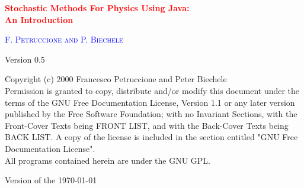 \documentclass[fleqn,10pt,a4paper,openright, draft]{book}
\begin{document}


\begin{titlepage}

\begin{center}
\huge 
\textcolor{red}{
\textbf{
Stochastic Methods For Physics Using Java: \\
An Introduction
} }
\end{center}
\vspace*{.5cm}

\begin{center}
\LARGE
\textcolor{blue}{
\textsc{F. Petruccione and P. Biechele }}
\end{center}
\vfill
\begin{center}
\textsf{\LARGE Version 0.5}
\end{center}
\vfill
\begin{center}
\large
  Copyright (c)  2000  Francesco Petruccione and Peter Biechele \\
      Permission is granted to copy, distribute and/or modify this document
      under the terms of the GNU Free Documentation License, Version 1.1
      or any later version published by the Free Software Foundation;
      with no Invariant Sections, with the
      Front-Cover Texts being FRONT LIST, and with the Back-Cover Texts 
      being BACK LIST.
      A copy of the license is included in the section entitled "GNU
      Free Documentation License".\\
      All programs contained herein are under the GNU GPL.
\end{center}
\vspace*{.5cm}

\begin{center}
\large
\textsf{Version of the \today}
\end{center}

\end{titlepage}


\tableofcontents
\clearpage
\listoffigures 
\clearpage
\listoftables
\clearpage
\lstlistoflistings
\clearpage
\end{document}
